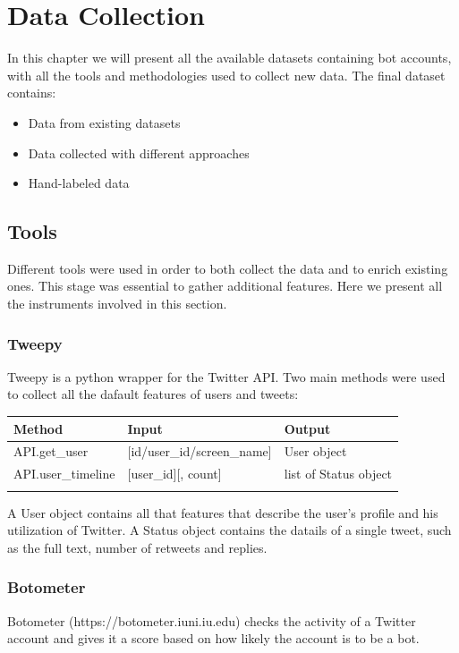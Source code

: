 
\chapter{Data Collection}
\label{capitolo3}
\thispagestyle{empty}


In this chapter we will present all the available datasets containing bot accounts, with all the tools and methodologies used to collect new data. The final dataset contains:

\begin{itemize}
\item[\PencilRight]Data from existing datasets
\item[\PencilRight]Data collected with different approaches
\item[\PencilRight]Hand-labeled data
\end{itemize}

\section{Tools}
Different tools were used in order to both collect the data and to enrich existing ones. This stage was essential to gather additional features. Here we present all the instruments involved in this section.

\subsection{Tweepy}
Tweepy is a python wrapper for the Twitter API.
Two main methods were used to collect all the dafault features of users and tweets:\\


\begin{tabular}{lll}
\centering	
	Method&Input&Output\\ \hline\hline
	API.get\_user&[id/user\_id/screen\_name]&User object\\
	API.user\_timeline&[user\_id][, count]&list of Status object\\ \hline\\
\end{tabular}

A User object contains all that features that describe the user's profile and his utilization of Twitter.
A Status object contains the datails of a single tweet, such as the full text, number of retweets and replies.

\subsection{Botometer}
Botometer (https://botometer.iuni.iu.edu) checks the activity of a Twitter account and gives it a score based on how likely the account is to be a bot.

